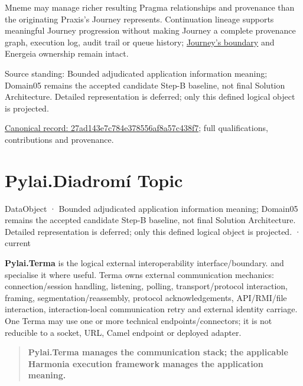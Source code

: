 Mneme may manage richer resulting Pragma relationships and provenance than the
originating Praxis's Journey represents. Continuation lineage supports meaningful
Journey progression without making Journey a complete provenance graph, execution
log, audit trail or queue history; \hyperref[element:359b901df27f4b43b5a2ff14a8484e34]{Journey's boundary}
and Energeia ownership remain intact.



Source standing: Bounded adjudicated application information meaning; Domain05 remains the accepted candidate Step-B baseline, not final Solution Architecture. Detailed representation is deferred; only this defined logical object is projected.


{\footnotesize \href{../../../../continuum/application/data-object/27ad143e7c784e378556af8a57c438f7.md}{Canonical record: 27ad143e7c784e378556af8a57c438f7}; full qualifications, contributions and provenance.}\par
\section{Pylai.Diadromí Topic}

\label{element:978f5c2bd2d343ffaf3a13dff700c258}
{\small DataObject · Bounded adjudicated application information meaning; Domain05 remains the accepted candidate Step-B baseline, not final Solution Architecture. Detailed representation is deferred; only this defined logical object is projected. · current}\par

\textbf{Pylai.Terma} is the logical external interoperability interface/boundary.
\texttt{} and \texttt{} specialise it where useful. Terma owns
external communication mechanics: connection/session handling, listening, polling,
transport/protocol interaction, framing, segmentation/reassembly, protocol
acknowledgements, API/RMI/file interaction, interaction-local communication retry
and external identity carriage. One Terma may use one or more technical endpoints/connectors;
it is not reducible to a socket, URL, Camel endpoint or deployed adapter.



\begin{quote}


\textbf{Pylai.Terma manages the communication stack; the applicable Harmonia
execution framework manages the application meaning.}



\end{quote}


